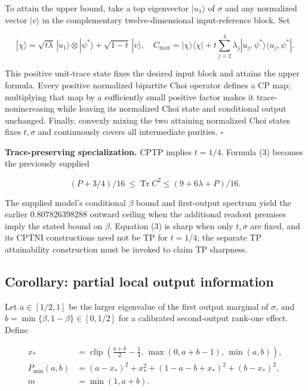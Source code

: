 \documentclass[
  10pt,
  a4paper,
]{article}
\begin{document}
To attain the upper bound, take a top eigenvector \(|u_1\rangle\) of \(\sigma\) and any normalized vector \(|v\rangle\) in the complementary twelve-dimensional input-reference block. Set

\[
|\chi\rangle=\sqrt{t\lambda}\,|u_1\rangle\otimes|\psi^*\rangle+\sqrt{1-t}\,|v\rangle,
\quad C_{\max}=|\chi\rangle\langle\chi|+t\sum_{j=2}^4\lambda_j |u_j,\psi^*\rangle\langle u_j,\psi^*|.
\]

This positive unit-trace state fixes the desired input block and attains the upper formula. Every positive normalized bipartite Choi operator defines a CP map; multiplying that map by a sufficiently small positive factor makes it trace-nonincreasing while leaving its normalized Choi state and conditional output unchanged. Finally, convexly mixing the two attaining normalized Choi states fixes \(t,\sigma\) and continuously covers all intermediate purities. \(\square\)

\textbf{Trace-preserving specialization.} CPTP implies \(t=1/4\). Formula (3) becomes the previously supplied

\[\boxed{\quad (P+3/4)/16\ \le\operatorname{Tr}C^2\le (9+6\lambda+P)/16.\quad}\]

The supplied model's conditional \(\beta\) bound and first-output spectrum yield the earlier \(0.807826398288\) outward ceiling when the additional readout premises imply the stated bound on \(\beta\). Equation (3) is sharp when only \(t,\sigma\) are fixed, and its CPTNI constructions need not be TP for \(t=1/4\); the separate TP attainability construction must be invoked to claim TP sharpness.

\subsection{Corollary: partial local output information}\label{corollary-partial-local-output-information}

Let \(a\in[1/2,1]\) be the larger eigenvalue of the first output marginal of \(\sigma\), and \(b=\min\{\beta,1-\beta\}\in[0,1/2]\) for a calibrated second-output rank-one effect. Define

\[
\begin{aligned}
x_*&=\operatorname{clip}\!\left(\frac{a+b}{2}-\frac14,\,\max(0,a+b-1),\,\min(a,b)\right),\\
P_{\min}(a,b)&=(a-x_*)^2+x_*^2+(1-a-b+x_*)^2+(b-x_*)^2,\\
m&=\min(1,a+b).
\end{aligned}
\]
\end{document}
